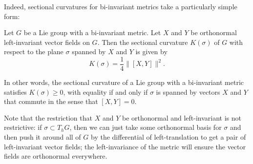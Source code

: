 Indeed, sectional curvatures for bi-invariant metrics take a particularly simple form:

\begin{theorem}\label{thm:sectional curvature bi-invariant metric}
	Let $G$ be a Lie group with a bi-invariant metric. Let $X$ and $Y$ be orthonormal left-invariant vector fields on $G$. Then the sectional curvature $K(\sigma)$ of $G$ with respect to the plane $\sigma$ spanned by $X$ and $Y$ is given by
	\[
		K(\sigma) = \frac{1}{4} \|[X,Y]\|^2.
	\]
\end{theorem}

In other words, the sectional curvature of a Lie group with a bi-invariant metric satisfies $K(\sigma)\geq 0$, with equality if and only if $\sigma$ is spanned by vectors $X$ and $Y$ that commute in the sense that $[X,Y]=0$.

Note that the restriction that $X$ and $Y$ be orthonormal and left-invariant is not restrictive: if $\sigma \subset T_hG$, then we can just take some orthonormal basis for $\sigma$ and then push it around all of $G$ by the differential of left-translation to get a pair of left-invariant vector fields; the left-invariance of the metric will ensure the vector fields are orthonormal everywhere.

